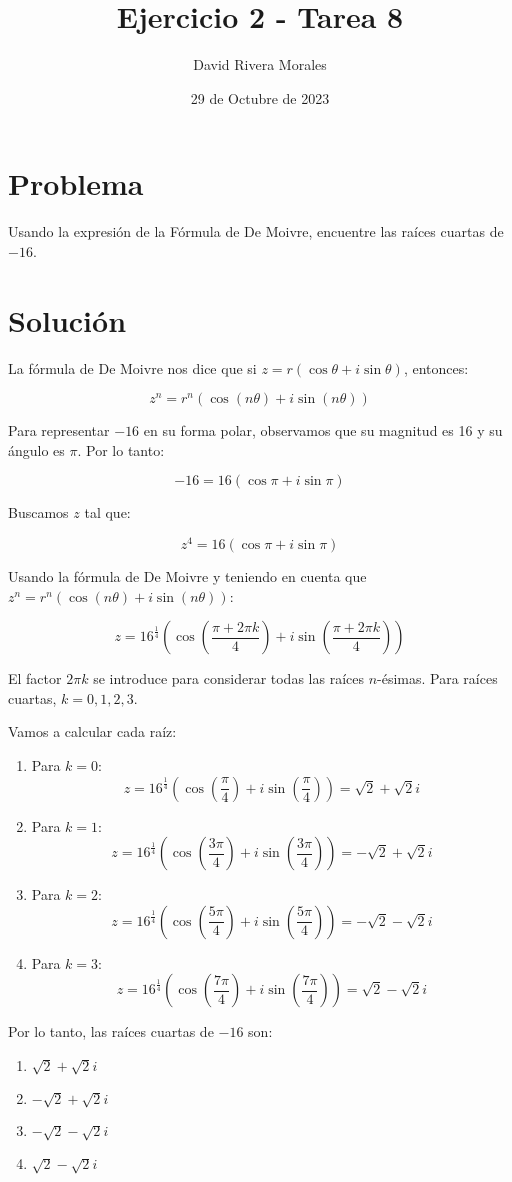 \documentclass{article}
\title{Ejercicio 2 - Tarea 8}
\author{David Rivera Morales}
\date{29 de Octubre de 2023}
\begin{document}
\maketitle

\section*{Problema}

Usando la expresión de la Fórmula de De Moivre, encuentre las raíces cuartas de \(-16\).

\section*{Solución}

La fórmula de De Moivre nos dice que si \( z = r(\cos \theta + i \sin \theta) \), entonces:

\[
z^n = r^n (\cos(n\theta) + i \sin(n\theta))
\]

Para representar \(-16\) en su forma polar, observamos que su magnitud es 16 y su ángulo es \(\pi\). Por lo tanto:

\[
-16 = 16(\cos \pi + i \sin \pi)
\]

Buscamos \( z \) tal que:

\[
z^4 = 16(\cos \pi + i \sin \pi)
\]

Usando la fórmula de De Moivre y teniendo en cuenta que \(z^n = r^n(\cos(n\theta) + i \sin(n\theta))\):

\[
z = 16^{\frac{1}{4}} \left( \cos\left(\frac{\pi + 2\pi k}{4}\right) + i \sin\left(\frac{\pi + 2\pi k}{4}\right) \right)
\]

El factor \(2\pi k\) se introduce para considerar todas las raíces \(n\)-ésimas. Para raíces cuartas, \( k = 0, 1, 2, 3 \).

Vamos a calcular cada raíz:

\begin{enumerate}
    \item Para \( k = 0 \):
    \[
    z = 16^{\frac{1}{4}} \left( \cos\left(\frac{\pi}{4}\right) + i \sin\left(\frac{\pi}{4}\right) \right) = \sqrt{2} + \sqrt{2}i
    \]
    
    \item Para \( k = 1 \):
    \[
    z = 16^{\frac{1}{4}} \left( \cos\left(\frac{3\pi}{4}\right) + i \sin\left(\frac{3\pi}{4}\right) \right) = -\sqrt{2} + \sqrt{2}i
    \]
    
    \item Para \( k = 2 \):
    \[
    z = 16^{\frac{1}{4}} \left( \cos\left(\frac{5\pi}{4}\right) + i \sin\left(\frac{5\pi}{4}\right) \right) = -\sqrt{2} - \sqrt{2}i
    \]
    
    \item Para \( k = 3 \):
    \[
    z = 16^{\frac{1}{4}} \left( \cos\left(\frac{7\pi}{4}\right) + i \sin\left(\frac{7\pi}{4}\right) \right) = \sqrt{2} - \sqrt{2}i
    \]
\end{enumerate}

Por lo tanto, las raíces cuartas de \(-16\) son:

\begin{enumerate}
    \item \( \sqrt{2} + \sqrt{2}i \)
    \item \( -\sqrt{2} + \sqrt{2}i \)
    \item \( -\sqrt{2} - \sqrt{2}i \)
    \item \( \sqrt{2} - \sqrt{2}i \)
\end{enumerate}
\end{document}
